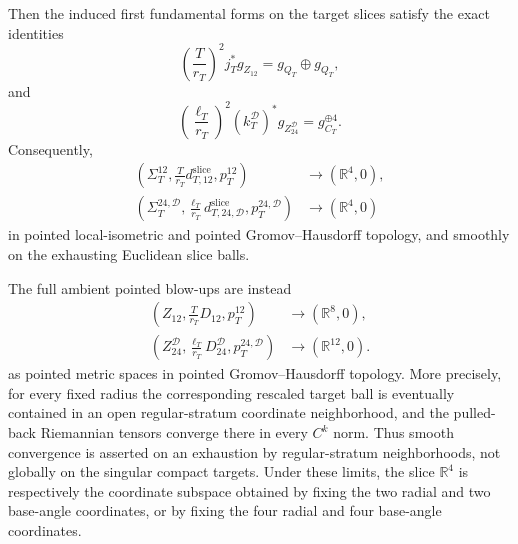 \begin{theorem}
Then the induced first fundamental forms on the target slices satisfy the
exact identities
\begin{equation}
 \left(\frac{T}{r_T}\right)^2
  j_T^*g_{Z_{12}}
 =g_{Q_T}\oplus g_{Q_T},
 \label{wb:sphere-metric-A-slice-exact}
\end{equation}
and
\begin{equation}
 \left(\frac{\ell_T}{r_T}\right)^2
  (k_T^{\mathcal D})^*g_{Z_{24}^{\mathcal D}}
 =g_{C_T}^{\oplus4}.
 \label{wb:sphere-metric-BC-slice-exact}
\end{equation}
Consequently,
\begin{align}
 \left(\Sigma_T^{12},\frac{T}{r_T}d_{T,12}^{\mathrm{slice}},
       p_T^{12}\right)
 &\longrightarrow(\mathbb R^4,0),\\
 \left(\Sigma_T^{24,\mathcal D},
       \frac{\ell_T}{r_T}d_{T,24,\mathcal D}^{\mathrm{slice}},
       p_T^{24,\mathcal D}\right)
 &\longrightarrow(\mathbb R^4,0)
 \label{wb:sphere-metric-slice-fixed-blowups}
\end{align}
in pointed local-isometric and pointed Gromov--Hausdorff topology, and
smoothly on the exhausting Euclidean slice balls.

The full ambient pointed blow-ups are instead
\begin{align}
 \left(Z_{12},\frac{T}{r_T}D_{12},p_T^{12}\right)
 &\longrightarrow(\mathbb R^8,0),\\
 \left(Z_{24}^{\mathcal D},
       \frac{\ell_T}{r_T}D_{24}^{\mathcal D},
       p_T^{24,\mathcal D}\right)
 &\longrightarrow(\mathbb R^{12},0).
 \label{wb:sphere-metric-ambient-fixed-blowups}
\end{align}
as pointed metric spaces in pointed Gromov--Hausdorff topology.  More
precisely, for every fixed radius the corresponding rescaled target ball is
eventually contained in an open regular-stratum coordinate neighborhood,
and the pulled-back Riemannian tensors converge there in every \(C^k\) norm.
Thus smooth convergence is asserted on an exhaustion by regular-stratum
neighborhoods, not globally on the singular compact targets.  Under these
limits, the slice \(\mathbb R^4\) is respectively the coordinate subspace
obtained by fixing the two radial and two base-angle coordinates, or by
fixing the four radial and four base-angle coordinates.
\end{theorem}



